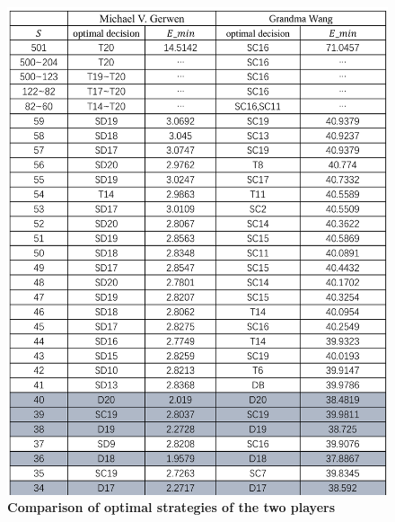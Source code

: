 \documentclass[cjjs]{ipart}
\theoremstyle{plain}
\begin{document}
\begin{figure}[H]
    \centering
    \begin{minipage}{0.45\textwidth}  
        \centering
        \includegraphics[width=\textwidth]{picture1.png}  
        \caption{\textbf{Comparison of optimal strategies of the two players}}  
        \label{fig:image1}
    \end{minipage} \hspace{0.5cm} 
    \begin{minipage}{0.45\textwidth} 
        \centering

\end{minipage}
\end{figure}
\end{document}
